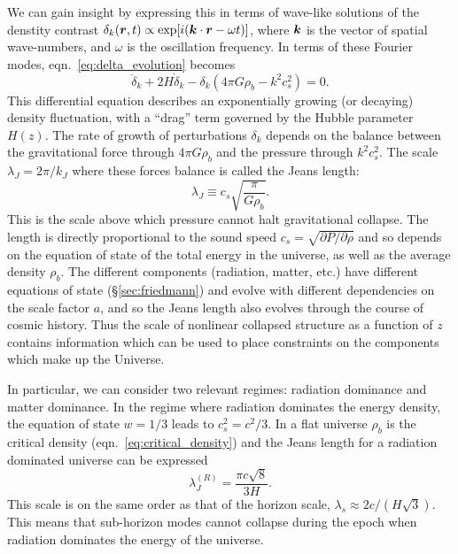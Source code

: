 We can gain insight by expressing this in terms of
wave-like solutions of the denstity contrast
$\delta_k(\boldsymbol{r}, t) \propto \exp[i(\boldsymbol{k}\cdot\boldsymbol{r} - \omega t)]$,
where $\boldsymbol{k}$ is the vector of spatial wave-numbers, and $\omega$
is the oscillation frequency.  In terms of these Fourier modes,
eqn.~\ref{eq:delta_evolution} becomes
\begin{equation}
  \label{eq:delta_evolution_k}
  \ddot{\delta}_k + 2 H \dot{\delta}_k - \delta_k(4\pi G\rho_b - k^2c_s^2) = 0.
\end{equation}
This differential equation describes an exponentially growing (or decaying)
density fluctuation, with a ``drag'' term governed by the Hubble parameter
$H(z)$.  The rate of growth of perturbations $\delta_k$ depends
on the balance between the gravitational force through $4\pi G\rho_b$ and the
pressure through $k^2c_s^2$.  The scale $\lambda_J = 2\pi/k_J$
where these forces balance is called the Jeans length:
\begin{equation}
  \label{eq:jeans_length}
  \lambda_J \equiv c_s \sqrt{\frac{\pi}{G\rho_b}}.
\end{equation}
This is the scale above which pressure cannot halt gravitational
collapse.  The length is directly proportional to the sound speed
$c_s = \sqrt{\partial P/\partial \rho}$ and so depends on the equation of
state of the total energy in the universe,
as well as the average density $\rho_b$.
The different components (radiation, matter, etc.) have different
equations of state (\S\ref{sec:friedmann}) and evolve
with different dependencies on the scale factor
$a$, and so the Jeans length also evolves through the course of cosmic
history.  Thus the scale of nonlinear
collapsed structure as a function of $z$ contains information which can
be used to place constraints on the components which make up the Universe.

In particular, we can consider two relevant regimes: radiation dominance
and matter dominance.  In the regime where radiation dominates the energy
density, the equation of state $w=1/3$ leads to $c_s^2 = c^2/3$.  In a flat
universe $\rho_b$ is the critical density (eqn.~\ref{eq:critical_density})
and the Jeans length for a radiation dominated universe can be expressed
\begin{equation}
  \label{eq:jeans_radiation}
  \lambda_J^{(R)} = \frac{\pi c \sqrt{8}}{3 H}.
\end{equation}
This scale is on the same order as that of the horizon scale,
$\lambda_s \approx 2c / (H\sqrt{3})$.  This means that sub-horizon modes
cannot collapse during the epoch when radiation dominates the energy
of the universe.

